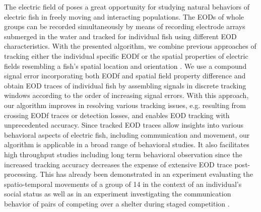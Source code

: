 The electric field of \lepto{} poses a great opportunity for studying natural behaviors of electric fish in freely moving and interacting populations. The EODs of whole groups can be recorded simultaneously by means of recording electrode arrays submerged in the water and tracked for individual fish using different EOD characteristics. With the presented algorithm, we combine previous approaches of tracking either the individual specific EODf \citep{Henninger2020} or the spatial properties of electric fields resembling a fish's spatial location and orientation \citep{Madhav2018}. We use a compound signal error incorporating both EODf and spatial field property difference and obtain EOD traces of individual fish by assembling signals in discrete tracking windows according to the order of increasing signal errors. With this approach, our algorithm improves in resolving various tracking issues, e.g. resulting from crossing EODf traces or detection losses, and enables EOD tracking with unprecedented accuracy. Since tracked EOD traces allow insights into various behavioral aspects of electric fish, including communication and movement, our algorithm is applicable in a broad range of behavioral studies. It also facilitates high throughput studies including long term behavioral observation since the increased tracking accuracy decreases the expense of extensive EOD trace post-processing. This has already been demonstrated in an experiment evaluating the spatio-temporal movements of a group of 14 \lepto{} in the context of an individual's social status \citep{Raab2019} as well as in an experiment investigating the communication behavior of pairs of \lepto{} competing over a shelter during staged competition \citep{Raab2021}.
%

%
%

